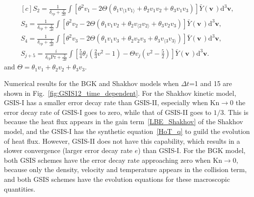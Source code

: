 \documentclass[onefignum,onetabnum]{siamart171218}
\begin{document}
\begin{equation}\label{L_lin2}
\begin{aligned}[c]
S_2=\frac{1}{\delta_{rp}+\frac{2}{\Delta{t}}}
\int\left[{\theta}^2{v}_1-{2\Theta}
(\theta_1v_{\langle{1}}v_{1\rangle}+\theta_2{v}_1 {v}_2+\theta_3{v}_1 {v}_3)\right]\bar{Y}(\bm{{v}}\,)\mathrm{d}^3\bm{{v}}, \\
S_3=\frac{1}{\delta_{rp}+\frac{2}{\Delta{t}}}
\int\left[{\theta}^2{v}_2-{2\Theta}
 (\theta_1{v}_1 {v}_2+\theta_2v_{\langle{2}}v_{2\rangle}+\theta_3{v}_2 {v}_3)\right]\bar{Y}(\bm{{v}}\,)\mathrm{d}^3\bm{{v}}, \\
S_4=\frac{1}{\delta_{rp}+\frac{2}{\Delta{t}}}
\int\left[{\theta}^2{v}_3-{2\Theta}
 (\theta_1{v}_1 {v}_3+\theta_2{v}_2 {v}_3+\theta_3v_{\langle{3}}v_{3\rangle})\right]\bar{Y}(\bm{{v}}\,)\mathrm{d}^3\bm{{v}}, \\
S_{j+5}=\frac{i}{\delta_{rp}\text{Pr}+\frac{2}{\Delta{t}}}
\int\left[\frac{5}{4}\theta_j\left(\frac{2}{3}{v}^2-1\right)-{\Theta}
{v}_j\left({v}^2-\frac{5}{2}\right)\right]\bar{Y}(\bm{{v}}\,)\mathrm{d}^3\bm{{v}}.
\end{aligned} 
\end{equation} 
and $\Theta=\theta_1{v}_1+\theta_2v_2+\theta_3v_3$. 


Numerical results for the BGK and Shakhov models when $\Delta{t}$=1 and 15 are shown in Fig.~\ref{fig:GSIS12_time_dependent}. For the Shakhov kinetic model, GSIS-I has a smaller error decay rate than GSIS-II, especially when $\text{Kn}\rightarrow0$ the error decay rate of GSIS-I goes to zero, while that of GSIS-II goes to $1/3$. This is because the heat flux appears in the gain term~\eqref{LBE_Shakhov} of the Shakhov model, and the GSIS-I has the synthetic equation~\eqref{HoT_q} to guild the evolution of heat flux. However, GSIS-II does not have this capability, which results in a slower convergence  (larger error decay rate $e$) than GSIS-I. For the BGK model, both GSIS schemes have the error decay rate approaching zero when $\text{Kn}\rightarrow0$, because only the density, velocity and temperature appears in the collision term, and both GSIS schemes have the evolution equations for these macroscopic quantities.
\end{document}
